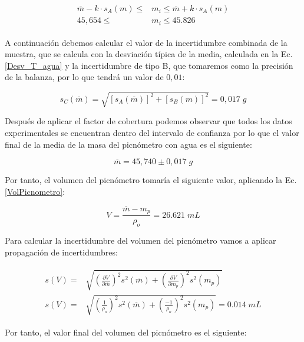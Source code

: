 \documentclass[a4paper,12pt,titlepage]{report}
\begin{document}
\begin{align}
    \begin{split}
        \overline{m} - k \cdot s_{A}(m) \leq &m_{i} \leq \overline{m} + k \cdot s_{A}(m) \\
        45,654 \leq &m_{i} \leq 45.826
    \end{split}
\end{align}

A continuación debemos calcular el valor de la incertidumbre combinada de la muestra, que se calcula con la desviación típica de la media, calculada en la Ec.\ref{Desv_T_agua} y la incertidumbre de tipo B, que tomaremos como la precisión de la balanza, por lo que tendrá un valor de $0,01$:

\begin{equation}
    s_{C}(\overline{m}) = \sqrt{[s_{A}(\overline{m})]^2+[s_{B}(m)]^2} = 0,017 \; g
    \label{Inc combinada}
\end{equation}

Después de aplicar el factor de cobertura podemos observar que todos los datos experimentales se encuentran dentro del intervalo de confianza por lo que el valor final de la media de la masa del picnómetro con agua es el siguiente:

\begin{equation}
    \overline{m} = 45,740 \pm 0,017 \; g
\end{equation}

Por tanto, el volumen del picnómetro tomaría el siguiente valor, aplicando la Ec.\ref{VolPicnometro}:

\begin{equation}
    V = \frac{\overline{m}-m_{p}}{\rho_{o}}  = 26.621\; mL
\end{equation}

Para calcular la incertidumbre del volumen del picnómetro vamos a aplicar propagación de incertidumbres:

\begin{align}
    \begin{split}
    s(V) = &\sqrt{\left (\frac{\partial V}{\partial \overline{m}}\right )^2 s^2(\overline{m})  + \left (\frac{\partial V}{\partial m_{p}}\right )^2 s^2(m_{p})} \\
    s(V) = &\sqrt{\left (\frac{1}{\rho_{o}}\right )^2 s^2(\overline{m})  + \left (\frac{-1}{\rho_{o}}\right )^2 s^2(m_{p})} = 0.014 \; mL
    \end{split}
\end{align}

Por tanto, el valor final del volumen del picnómetro es el siguiente:
\end{document}
